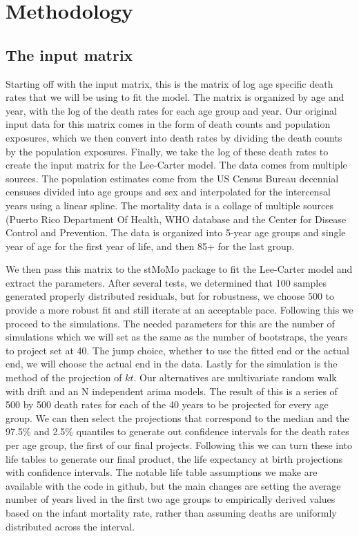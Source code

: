 \documentclass[
  12pt,
]{report}
\begin{document}
\chapter{Methodology}\label{methodology}

\section{The input matrix}\label{the-input-matrix}

Starting off with the input matrix, this is the matrix of log age
specific death rates that we will be using to fit the model. The matrix
is organized by age and year, with the log of the death rates for each
age group and year. Our original input data for this matrix comes in the
form of death counts and population exposures, which we then convert
into death rates by dividing the death counts by the population
exposures. Finally, we take the log of these death rates to create the
input matrix for the Lee-Carter model. The data comes from multiple
sources. The population estimates come from the US Census Bureau
decennial censuses divided into age groups and sex and interpolated for
the intercensal years using a linear spline. The mortality data is a
collage of multiple sources (Puerto Rico Department Of Health, WHO
database and the Center for Disease Control and Prevention. The data is
organized into 5-year age groups and single year of age for the first
year of life, and then 85+ for the last group.

We then pass this matrix to the stMoMo package to fit the Lee-Carter
model and extract the parameters. After several tests, we determined
that 100 samples generated properly distributed residuals, but for
robustness, we choose 500 to provide a more robust fit and still iterate
at an acceptable pace. Following this we proceed to the simulations. The
needed parameters for this are the number of simulations which we will
set as the same as the number of bootstraps, the years to project set at
40. The jump choice, whether to use the fitted end or the actual end, we
will choose the actual end in the data. Lastly for the simulation is the
method of the projection of \(kt\). Our alternatives are multivariate
random walk with drift and an N independent arima models. The result of
this is a series of 500 by 500 death rates for each of the 40 years to
be projected for every age group. We can then select the projections
that correspond to the median and the 97.5\% and 2.5\% quantiles to
generate out confidence intervals for the death rates per age group, the
first of our final projects. Following this we can turn these into life
tables to generate our final product, the life expectancy at birth
projections with confidence intervals. The notable life table
assumptions we make are available with the code in github, but the main
changes are setting the average number of years lived in the first two
age groups to empirically derived values based on the infant mortality
rate, rather than assuming deaths are uniformly distributed across the
interval.
\end{document}
